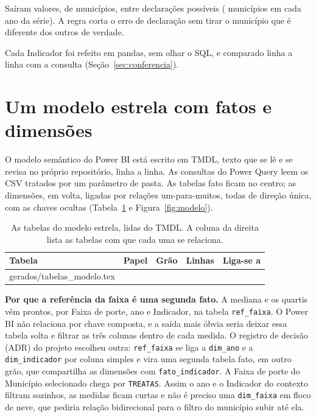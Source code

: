 \documentclass[11pt,a4paper]{article}
\makeatletter
\newenvironment{tabelaplena}
  {\begin{lrbox}{\tabelacaixa}}
  {\end{lrbox}\makebox[\linewidth][c]{\usebox{\tabelacaixa}}}
\newcommand{\linhasde}[1]{\@@input #1 }
\makeatother
\begin{document}
\begin{destaque}
  Saíram \NumExclusoes{} valores, de \NumMunicipiosComExclusao{}
  municípios, entre \NumMunicipioAnos{} declarações possíveis
  (\NumMunicipios{} municípios em cada ano da série). A regra corta o erro
  de declaração sem tirar o município que é diferente dos outros de
  verdade.
\end{destaque}

Cada Indicador foi refeito em pandas, sem olhar o SQL, e comparado linha
a linha com a consulta (Seção~\ref{sec:conferencia}).

\section{Um modelo estrela com \NumTabelasFato{} fatos e \NumDimensoes{} dimensões}
\label{sec:modelo}

O modelo semântico do Power BI está escrito em TMDL, texto que se lê e se
revisa no próprio repositório, linha a linha. As consultas do Power Query
leem os CSV tratados por um parâmetro de pasta. As tabelas fato ficam no
centro; as dimensões, em volta, ligadas por \NumRelacoes{} relações
um-para-muitos, todas de direção única, com as chaves ocultas
(Tabela~\ref{tab:modelo} e Figura~\ref{fig:modelo}).

\begin{table}[H]
  \centering
  \caption{As tabelas do modelo estrela, lidas do TMDL. A coluna da direita
    lista as tabelas com que cada uma se relaciona.}
  \label{tab:modelo}
  \small
  \begin{tabelaplena}
  \begin{tabular}{@{}lllrp{6cm}@{}}
    \toprule
    Tabela & Papel & Grão & Linhas & Liga-se a \\
    \midrule
    \linhasde{gerados/tabelas_modelo.tex}
    \bottomrule
  \end{tabular}
  \end{tabelaplena}
\end{table}

\textbf{Por que a referência da faixa é uma segunda fato.} A mediana e os
quartis vêm prontos, por Faixa de porte, ano e Indicador, na tabela
\texttt{ref\_faixa}. O Power BI não relaciona por chave composta, e a
saída mais óbvia seria deixar essa tabela solta e filtrar as três colunas
dentro de cada medida. O registro de decisão (ADR) do projeto escolheu
outra: \texttt{ref\_faixa} se liga a \texttt{dim\_ano} e a
\texttt{dim\_indicador} por coluna simples e vira uma segunda tabela fato,
em outro grão, que compartilha as dimensões com \texttt{fato\_indicador}.
A Faixa de porte do Município selecionado chega por \texttt{TREATAS}. Assim
o ano e o Indicador do contexto filtram sozinhos, as medidas ficam curtas e
não é preciso uma \texttt{dim\_faixa} em floco de neve, que pediria relação
bidirecional para o filtro do município subir até ela.
\end{document}
